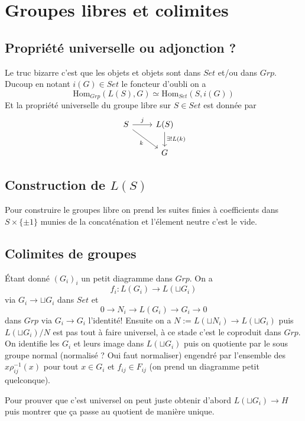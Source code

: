 \documentclass[a4paper,12pt]{book}
\title{}
\date{2024-2025}
\newcommand{\Hom}{\textrm{Hom}}
\theoremstyle{plain}
\theoremstyle{definition}
\theoremstyle{remark}
\begin{document}
\maketitle
\tableofcontents
\chapter{Groupes libres et colimites}
\section{Propriété universelle ou adjonction ?}
Le truc bizarre c'est que les objets et objets sont dans $Set$
et/ou dans $Grp$. Ducoup en notant $i(G)\in Set$ le foncteur
d'oubli on a
\[\Hom_{Grp}(L(S),G)\simeq \Hom_{Set}(S,i(G))\]
Et la propriété universelle du groupe libre sur $S\in Set$
est donnée par 
\[\begin{tikzcd}
	S & {L(S)} \\
	& G
	\arrow["j", from=1-1, to=1-2]
	\arrow["k"', from=1-1, to=2-2]
	\arrow["{\exists !L(k)}", from=1-2, to=2-2]
\end{tikzcd}\]
\section{Construction de $L(S)$}
Pour construire le groupes libre on prend les suites finies 
à coefficients dans $S\times \{\pm 1\}$ munies de la concaténation
et l'élement neutre c'est le vide.

\section{Colimites de groupes}
Étant donné $(G_i)_i$ un petit diagramme dans $Grp$. On a
\[f_i\colon L(G_i)\to L(\sqcup G_i)\]
via $G_i\to \sqcup G_i$ dans $Set$
et
\[0\to N_i\to L(G_i)\to G_i\to 0\]
dans $Grp$ via $G_i\to G_i$ l'identité! Ensuite on a
$N:=L(\sqcup N_i)\to L(\sqcup G_i)$
puis $L(\sqcup G_i)/N$ est pas tout à faire universel, à ce
stade c'est le coproduit dans $Grp$. On 
identifie les $G_i$ et leurs image dans $L(\sqcup G_i)$ puis on
quotiente par le sous groupe normal (normalisé ? Oui faut
normaliser) engendré par l'ensemble des
$x\rho_{ij}^{-1}(x)$ pour tout $x\in G_i$ et $f_{ij}\in F_{ij}$
(on prend un diagramme petit quelconque). 

Pour prouver que c'est universel on peut juste obtenir d'abord
$L(\sqcup G_i)\to H$ puis montrer que ça passe au quotient de
manière unique. 
\end{document}
